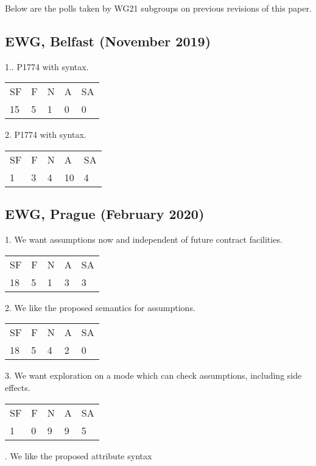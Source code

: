Below are the polls taken by WG21 subgroups on previous revisions of this paper.


\subsection{EWG, Belfast (November 2019)}

1.. P1774 with  syntax.

\hspace{6mm}
\begin{tabular}{lllll}
SF & F & N & A & SA \\
15 & 5 & 1 & 0 & 0
\end{tabular}

2. P1774 with  syntax.

\hspace{6mm}
\begin{tabular}{lllll}
SF & F & N & A & SA \\
1 & 3 & 4 & 10 & 4
\end{tabular}

\subsection{EWG, Prague (February 2020)}

1. We want assumptions now and independent of future contract facilities.

\hspace{6mm}
\begin{tabular}{lllll}
SF & F & N & A & SA \\
18 & 5 & 1 & 3 & 3
\end{tabular}

2. We like the proposed semantics for assumptions.

\hspace{6mm}
\begin{tabular}{lllll}
SF & F & N & A & SA \\
18 & 5 & 4 & 2 & 0
\end{tabular}

3. We want exploration on a mode which can check assumptions, including side effects.

\hspace{6mm}
\begin{tabular}{lllll}
SF & F & N & A & SA \\
1 & 0 & 9 & 9 & 5
\end{tabular}

. We like the proposed attribute syntax 

